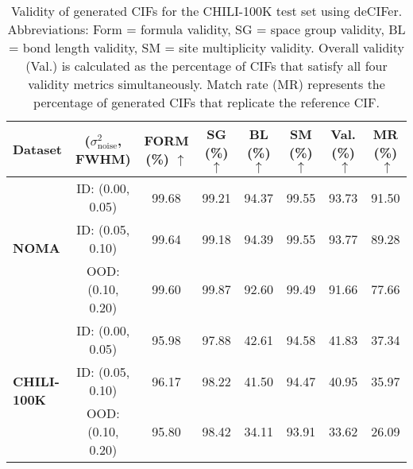 \begin{table}[ht!]
\caption{Validity of generated CIFs for the CHILI-100K test set using deCIFer. Abbreviations: Form = formula validity, SG = space group validity, BL = bond length validity, SM = site multiplicity validity. Overall validity (Val.) is calculated as the percentage of CIFs that satisfy all four validity metrics simultaneously. Match rate (MR) represents the percentage of generated CIFs that replicate the reference CIF.}
\label{sup-table:chili_100k_full_validity}
\vskip 0.1in
\begin{center}
\scriptsize
\begin{tabular}{lccccc|c|c}
\toprule
 {\bf Dataset} & ($\sigma_{\mathrm{noise}}^2$, {FWHM}) & FORM (\%) $\uparrow$ & SG (\%) $\uparrow$ & BL (\%) $\uparrow$ & SM (\%) $\uparrow$ & Val. (\%)$\;\uparrow$ & MR (\%)$\;\uparrow$\\
\midrule
\multirow{3}{*}{\bf NOMA} 
& ID: (0.00, 0.05)
& 99.68 & 99.21 & 94.37 & 99.55 & 93.73 & 91.50\\
& ID: (0.05, 0.10)
& 99.64 & 99.18 & 94.39 & 99.55 & 93.77 & 89.28\\
\cmidrule{2-8}
& OOD: (0.10, 0.20)
& 99.60 & 99.87 & 92.60 & 99.49 & 91.66 & 77.66\\
\midrule
\multirow{3}{*}{\bf CHILI-100K} 
& ID: (0.00, 0.05)
& 95.98 & 97.88 & 42.61 & 94.58 & 41.83 & 37.34 \\
& ID: (0.05, 0.10)
& 96.17 & 98.22 & 41.50 & 94.47 & 40.95 & 35.97\\
\cmidrule{2-8}
& OOD: (0.10, 0.20)
& 95.80 & 98.42 & 34.11 & 93.91 & 33.62 & 26.09\\
\bottomrule
\end{tabular}
\end{center}
\vskip -0.1in
\end{table}